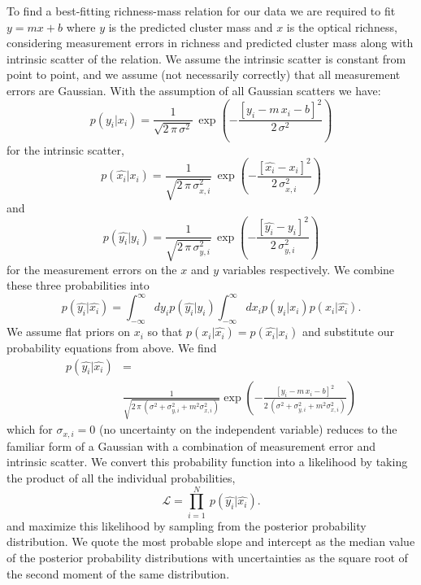 To find a best-fitting richness-mass relation for our data we are required to fit $y=mx+b$ where $y$ is the predicted cluster mass and $x$ is the optical richness, considering measurement errors in richness and predicted cluster mass along with intrinsic scatter of the relation. We assume the intrinsic scatter is constant from point to point, and we assume (not necessarily correctly) that all measurement errors are Gaussian. With the assumption of all Gaussian scatters we have:
\begin{equation}\label{eqn:intrinsic scatter}
	p(y_i|x_i) = \frac{1}{\sqrt{2\,\pi\,\sigma^2}}
	 \,\exp\left(-\frac{[y_i - m\,x_i - b]^2}{2\,\sigma^2}\right)
\end{equation}
for the intrinsic scatter,
\begin{equation}\label{eqn:xerr}
	p(\hat{x_i}|x_i) = \frac{1}{\sqrt{2\,\pi\,\sigma_{x,i}^2}}
	 \,\exp\left(-\frac{[\hat{x_i} - x_i]^2}{2\,\sigma_{x,i}^2}\right)
\end{equation}
and
\begin{equation}\label{eqn:yerr}
	p(\hat{y_i}|y_i) = \frac{1}{\sqrt{2\,\pi\,\sigma_{y,i}^2}}
	 \,\exp\left(-\frac{[\hat{y_i} -y_i]^2}{2\,\sigma_{y,i}^2}\right)
\end{equation}
for the measurement errors on the $x$ and $y$ variables respectively. We combine these three probabilities into
\begin{equation}
	p(\hat{y_i}|\hat{x_i}) = \int_{-\infty}^\infty dy_ip(\hat{y_i}|y_i) \int_{-\infty}^\infty dx_ip(y_i|x_i)p(x_i|\hat{x_i}).
\end{equation}
We assume flat priors on $x_i$ so that $p(x_i|\hat{x_i}) = p(\hat{x_i}|x_i)$ and substitute our probability equations from above. We find
\begin{equation}
	\begin{split}
	p(\hat{y_i}|\hat{x_i}) & = \\ 
	&\frac{1}{\sqrt{2\,\pi\,(\sigma^2 + \sigma_{y,i}^2 + m^2\sigma_{x,i}^2)}}\exp\left(-\frac{[y_i - m\,x_i - b]^2}{2\,(\sigma^2 + \sigma_{y,i}^2 + m^2\sigma_{x,i}^2)}\right)
	\end{split}
\end{equation}
which for $\sigma_{x,i}=0$ (no uncertainty on the independent variable) reduces to the familiar form of a Gaussian with a combination of measurement error and intrinsic scatter. We convert this probability function into a likelihood by taking the product of all the individual probabilities,  
\begin{equation}\label{eq:like}
\mathscr{L} = \prod_{i=1}^N \ p(\hat{y_i}|\hat{x_i}).
\end{equation}
and maximize this likelihood by sampling from the posterior probability distribution. We quote the most probable slope and intercept as the median value of the posterior probability distributions with uncertainties as the square root of the second moment of the same distribution.

